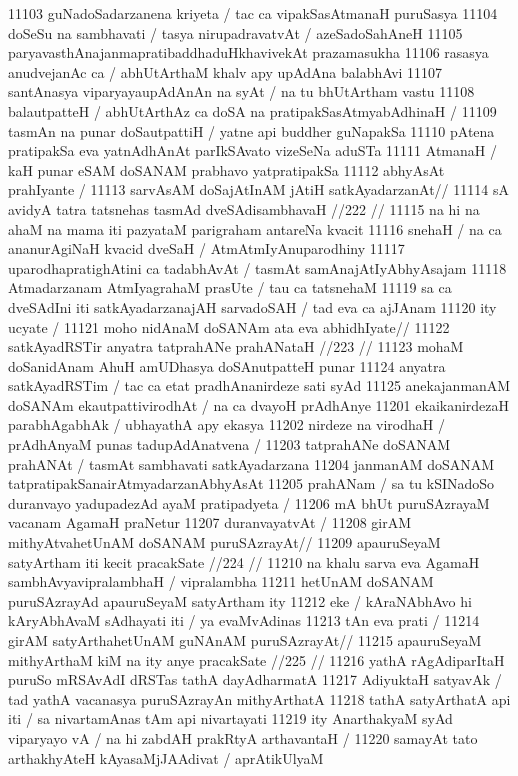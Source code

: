 11103 guNadoSadarzanena kriyeta / tac ca vipakSasAtmanaH puruSasya 
11104 doSeSu na sambhavati / tasya nirupadravatvAt / azeSadoSahAneH
11105 paryavasthAnajanmapratibaddhaduHkhavivekAt prazamasukha  
11106 rasasya anudvejanAc ca / abhUtArthaM khalv apy upAdAna balabhAvi
11107 santAnasya viparyayaupAdAnAn na syAt / na tu bhUtArtham vastu
11108 balautpatteH / abhUtArthAz ca doSA na pratipakSasAtmyabAdhinaH /
11109 tasmAn na punar doSautpattiH / yatne api buddher guNapakSa
11110 pAtena pratipakSa eva yatnAdhAnAt parIkSAvato vizeSeNa aduSTa 
11111 AtmanaH / kaH punar eSAM doSANAM prabhavo yatpratipakSa 
11112 abhyAsAt prahIyante /  
11113 	sarvAsAM doSajAtInAM jAtiH satkAyadarzanAt// 
11114 	sA avidyA tatra tatsnehas tasmAd dveSAdisambhavaH //222 // 
11115 na hi na ahaM na mama iti pazyataM parigraham antareNa kvacit 
11116 snehaH / na ca ananurAgiNaH kvacid dveSaH / AtmAtmIyAnuparodhiny  
11117 uparodhapratighAtini ca tadabhAvAt / tasmAt samAnajAtIyAbhyAsajam
11118 Atmadarzanam AtmIyagrahaM prasUte / tau ca tatsnehaM
11119 sa ca dveSAdIni iti satkAyadarzanajAH sarvadoSAH / tad eva ca ajJAnam
11120 ity ucyate /  
11121 	moho nidAnaM doSANAm ata eva abhidhIyate//  
11122 	satkAyadRSTir anyatra tatprahANe prahANataH //223 //  
11123 mohaM doSanidAnam AhuH amUDhasya doSAnutpatteH punar 
11124 anyatra satkAyadRSTim / tac ca etat pradhAnanirdeze sati syAd
11125 anekajanmanAM doSANAm ekautpattivirodhAt / na ca dvayoH prAdhAnye
11201 ekaikanirdezaH parabhAgabhAk / ubhayathA apy ekasya  
11202 nirdeze na virodhaH / prAdhAnyaM punas tadupAdAnatvena / 
11203 tatprahANe doSANAM prahANAt / tasmAt sambhavati satkAyadarzana
11204 janmanAM doSANAM tatpratipakSanairAtmyadarzanAbhyAsAt 
11205 prahANam / sa tu kSINadoSo duranvayo yadupadezAd ayaM pratipadyeta / 
11206 mA bhUt puruSAzrayaM vacanam AgamaH praNetur
11207 duranvayatvAt / 
11208 	girAM mithyAtvahetUnAM doSANAM puruSAzrayAt// 
11209 	apauruSeyaM satyArtham iti kecit pracakSate //224 // 
11210 na khalu sarva eva AgamaH sambhAvyavipralambhaH / vipralambha
11211 hetUnAM doSANAM puruSAzrayAd apauruSeyaM satyArtham ity
11212 eke / kAraNAbhAvo hi kAryAbhAvaM sAdhayati iti / ya evaMvAdinas 
11213 tAn eva prati / 
11214 	girAM satyArthahetUnAM guNAnAM puruSAzrayAt//
11215 	apauruSeyaM mithyArthaM kiM na ity anye pracakSate //225 //  
11216 yathA rAgAdiparItaH puruSo mRSAvAdI dRSTas tathA dayAdharmatA
11217 AdiyuktaH satyavAk / tad yathA vacanasya puruSAzrayAn mithyArthatA
11218 tathA satyArthatA api iti / sa nivartamAnas tAm api nivartayati  
11219 ity AnarthakyaM syAd viparyayo vA / na hi zabdAH prakRtyA arthavantaH /
11220 samayAt tato arthakhyAteH kAyasaMjJAAdivat / aprAtikUlyaM
